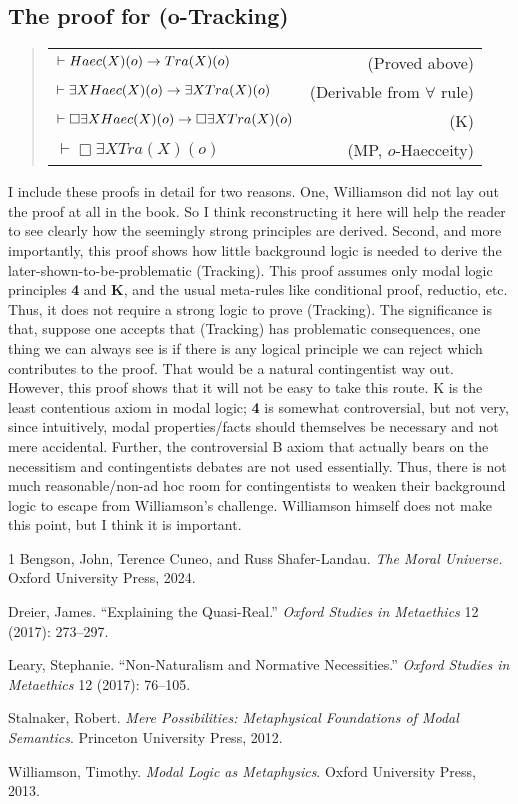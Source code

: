 \subsection{The proof for (o-Tracking)} 
\begin{quote}
\begin{tabulary}{\textwidth}{LR}
$\vdash Haec(X)(o) \rightarrow Tra(X)(o)$ & (Proved above) \\
$\vdash \exists X Haec(X)(o) \rightarrow \exists X Tra(X)(o)$ & (Derivable from $\forall$ rule) \\
$\vdash \Box \exists X Haec(X)(o) \rightarrow \Box \exists X Tra(X)(o)$ & (K)\\
$\vdash \Box \exists X Tra(X)(o)$ & (MP, $o$-Haecceity) 
\end{tabulary}
\end{quote}


\noindent I include these proofs in detail for two reasons. One, Williamson did not lay out the proof at all in the book. So I think reconstructing it here will help the reader to see clearly how the seemingly strong principles are derived. Second, and more importantly, this proof shows how little background logic is needed to derive the later-shown-to-be-problematic (Tracking). This proof assumes only modal logic principles \textbf{4} and \textbf{K}, and the usual meta-rules like conditional proof, reductio, etc. Thus, it  does not require a strong logic to prove (Tracking). The significance is that, suppose one accepts that (Tracking) has problematic consequences, one thing we can always see is if there is any logical principle we can reject which contributes to the proof. That would be a natural contingentist way out. However, this proof shows that it will not be easy to take this route. K is the least contentious axiom in modal logic; \textbf{4} is somewhat controversial, but not very, since intuitively, modal properties/facts should themselves be necessary and not mere accidental. Further, the controversial B axiom that actually bears on the necessitism and contingentists debates are not used essentially. Thus, there is not much reasonable/non-ad hoc room for contingentists to weaken their background logic to escape from Williamson's challenge. Williamson himself does not make this point, but I think it is important. 


\begin{hangparas}{\hangingindent}{1}
  Bengson, John, Terence Cuneo, and Russ Shafer-Landau. \textit{The Moral Universe.} Oxford University Press, 2024.

  Dreier, James. ``Explaining the Quasi-Real.'' \textit{Oxford Studies in Metaethics} 12 (2017): 273--297.

  Leary, Stephanie. ``Non-Naturalism and Normative Necessities.'' \textit{Oxford Studies in Metaethics} 12 (2017): 76--105.

  Stalnaker, Robert. \textit{Mere Possibilities: Metaphysical Foundations of Modal Semantics}. Princeton University Press, 2012.

  Williamson, Timothy. \textit{Modal Logic as Metaphysics}. Oxford University Press, 2013.
  \end{hangparas}
